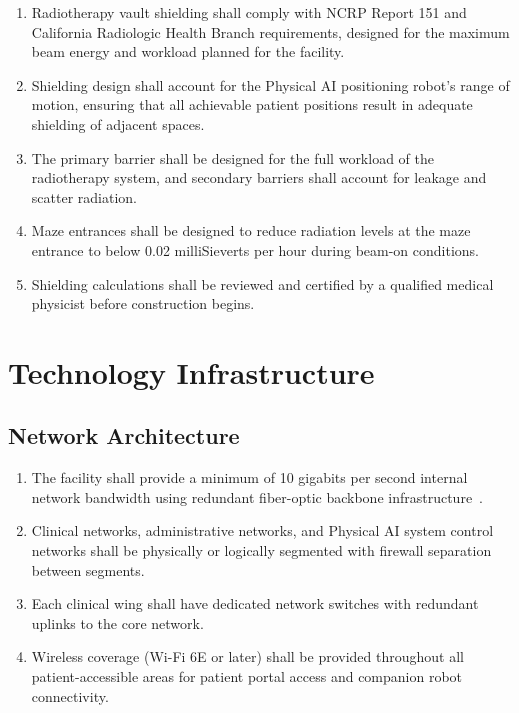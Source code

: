 \begin{enumerate}[label=(\alph*)]
\item Radiotherapy vault shielding shall comply with NCRP Report 151 and
  California Radiologic Health Branch requirements, designed for the maximum
  beam energy and workload planned for the facility.

\item Shielding design shall account for the Physical AI positioning robot's
  range of motion, ensuring that all achievable patient positions result in
  adequate shielding of adjacent spaces.

\item The primary barrier shall be designed for the full workload of the
  radiotherapy system, and secondary barriers shall account for leakage and
  scatter radiation.

\item Maze entrances shall be designed to reduce radiation levels at the maze
  entrance to below 0.02 milliSieverts per hour during beam-on conditions.

\item Shielding calculations shall be reviewed and certified by a qualified
  medical physicist before construction begins.
\end{enumerate}

\section{Technology Infrastructure}

\subsection{Network Architecture}

\begin{enumerate}[label=(\alph*)]
\item The facility shall provide a minimum of 10 gigabits per second internal
  network bandwidth using redundant fiber-optic backbone
  infrastructure~\cite{sitespec2026}.

\item Clinical networks, administrative networks, and Physical AI system control
  networks shall be physically or logically segmented with firewall separation
  between segments.

\item Each clinical wing shall have dedicated network switches with redundant
  uplinks to the core network.

\item Wireless coverage (Wi-Fi 6E or later) shall be provided throughout all
  patient-accessible areas for patient portal access and companion robot
  connectivity.
\end{enumerate}

